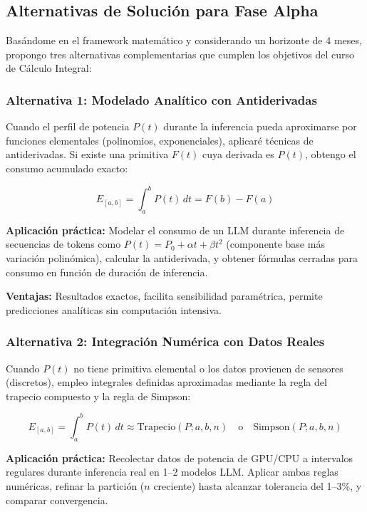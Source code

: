 \subsection{Alternativas de Solución para Fase Alpha}

Basándome en el framework matemático y considerando un horizonte de 4 meses, propongo tres alternativas complementarias que cumplen los objetivos del curso de Cálculo Integral:

\subsubsection{Alternativa 1: Modelado Analítico con Antiderivadas}

Cuando el perfil de potencia $P(t)$ durante la inferencia pueda aproximarse por funciones elementales (polinomios, exponenciales), aplicaré técnicas de antiderivadas. Si existe una primitiva $F(t)$ cuya derivada es $P(t)$, obtengo el consumo acumulado exacto:

\begin{equation}
E_{[a,b]} = \int_a^b P(t)\,dt = F(b) - F(a)
\end{equation}

\noindent\textbf{Aplicación práctica:} Modelar el consumo de un LLM durante inferencia de secuencias de tokens como $P(t) = P_0 + \alpha t + \beta t^2$ (componente base más variación polinómica), calcular la antiderivada, y obtener fórmulas cerradas para consumo en función de duración de inferencia.

\noindent\textbf{Ventajas:} Resultados exactos, facilita sensibilidad paramétrica, permite predicciones analíticas sin computación intensiva.

\subsubsection{Alternativa 2: Integración Numérica con Datos Reales}

Cuando $P(t)$ no tiene primitiva elemental o los datos provienen de sensores (discretos), empleo integrales definidas aproximadas mediante la regla del trapecio compuesto y la regla de Simpson:

\begin{equation}
E_{[a,b]} = \int_a^b P(t)\,dt \approx \text{Trapecio}(P; a, b, n) \quad \text{o} \quad \text{Simpson}(P; a, b, n)
\end{equation}

\noindent\textbf{Aplicación práctica:} Recolectar datos de potencia de GPU/CPU a intervalos regulares durante inferencia real en 1--2 modelos LLM. Aplicar ambas reglas numéricas, refinar la partición ($n$ creciente) hasta alcanzar tolerancia del 1--3\%, y comparar convergencia.

